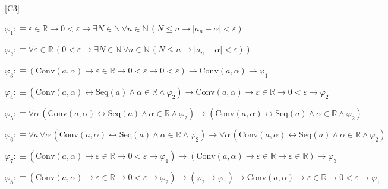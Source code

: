 \begin{fullproof}{[C3]}
\begin{ptree}
\end{ptree}
\begin{abbrevlist}
\item $\varphi_{1} :\equiv \varepsilon \in \mathbb{R} \to 0 < \varepsilon \to \exists N \in \mathbb{N}\,\forall n \in \mathbb{N}\,(N \leq n \to \lvert a_{n} - \alpha \rvert < \varepsilon)$
\item $\varphi_{2} :\equiv \forall \varepsilon \in \mathbb{R}\,(0 < \varepsilon \to \exists N \in \mathbb{N}\,\forall n \in \mathbb{N}\,(N \leq n \to \lvert a_{n} - \alpha \rvert < \varepsilon))$
\item $\varphi_{3} :\equiv (\mathrm{Conv}(a,\alpha) \to \varepsilon \in \mathbb{R} \to 0 < \varepsilon \to 0 < \varepsilon) \to \mathrm{Conv}(a,\alpha) \to \varphi_{1}$
\item $\varphi_{4} :\equiv (\mathrm{Conv}(a,\alpha) \leftrightarrow \mathrm{Seq}(a) \land \alpha \in \mathbb{R} \land \varphi_{2}) \to \mathrm{Conv}(a,\alpha) \to \varepsilon \in \mathbb{R} \to 0 < \varepsilon \to \varphi_{2}$
\item $\varphi_{5} :\equiv \forall \alpha\,(\mathrm{Conv}(a,\alpha) \leftrightarrow \mathrm{Seq}(a) \land \alpha \in \mathbb{R} \land \varphi_{2}) \to (\mathrm{Conv}(a,\alpha) \leftrightarrow \mathrm{Seq}(a) \land \alpha \in \mathbb{R} \land \varphi_{2})$
\item $\varphi_{6} :\equiv \forall a\,\forall \alpha\,(\mathrm{Conv}(a,\alpha) \leftrightarrow \mathrm{Seq}(a) \land \alpha \in \mathbb{R} \land \varphi_{2}) \to \forall \alpha\,(\mathrm{Conv}(a,\alpha) \leftrightarrow \mathrm{Seq}(a) \land \alpha \in \mathbb{R} \land \varphi_{2})$
\item $\varphi_{7} :\equiv (\mathrm{Conv}(a,\alpha) \to \varepsilon \in \mathbb{R} \to 0 < \varepsilon \to \varphi_{1}) \to (\mathrm{Conv}(a,\alpha) \to \varepsilon \in \mathbb{R} \to \varepsilon \in \mathbb{R}) \to \varphi_{3}$
\item $\varphi_{8} :\equiv (\mathrm{Conv}(a,\alpha) \to \varepsilon \in \mathbb{R} \to 0 < \varepsilon \to \varphi_{2}) \to (\varphi_{2} \to \varphi_{1}) \to \mathrm{Conv}(a,\alpha) \to \varepsilon \in \mathbb{R} \to 0 < \varepsilon \to \varphi_{1}$
\end{abbrevlist}
\end{fullproof}
